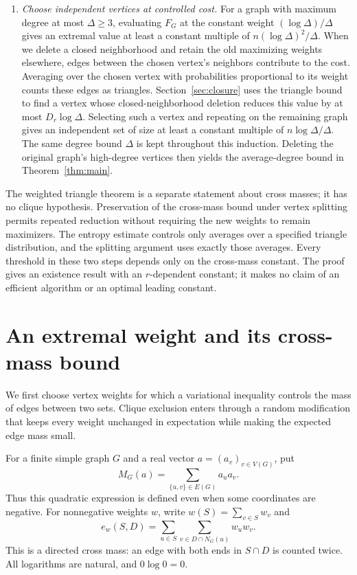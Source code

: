 \documentclass[11pt]{article}
\theoremstyle{definition}
\theoremstyle{remark}
\numberwithin{equation}{section}
\begin{document}
\begin{enumerate}
\item \emph{Choose independent vertices at controlled cost.}
For a graph with maximum degree at most $\Delta\ge3$, evaluating $F_G$ at
the constant weight $(\log\Delta)/\Delta$ gives an extremal value at
least a constant multiple of $n(\log\Delta)^2/\Delta$.
When we delete a closed neighborhood and retain the old maximizing weights
elsewhere, edges between the chosen vertex's neighbors contribute to
the cost. Averaging over the chosen vertex with probabilities proportional
to its weight counts these edges as triangles.
Section~\ref{sec:closure} uses the triangle bound to find a vertex whose
closed-neighborhood deletion reduces this value by at most
$D_r\log\Delta$. Selecting such a vertex and repeating on the remaining
graph gives an independent set of size at least a constant multiple of
$n\log\Delta/\Delta$. The same degree bound $\Delta$ is kept throughout
this induction. Deleting the original graph's high-degree vertices then
yields the average-degree bound in Theorem~\ref{thm:main}.
\end{enumerate}

The weighted triangle theorem is a separate statement about cross masses;
it has no clique hypothesis. Preservation of the cross-mass bound under
vertex splitting permits repeated reduction without requiring the new weights to
remain maximizers. The entropy estimate controls only averages over a
specified triangle distribution, and the splitting argument uses exactly
those averages. Every threshold in these two steps depends only on the
cross-mass constant. The proof gives an existence result with an
$r$-dependent constant; it makes no claim of an efficient algorithm or
an optimal leading constant.

\section{An extremal weight and its cross-mass bound}
\label{sec:optimizer}

We first choose vertex weights for which a variational inequality controls
the mass of edges between two sets.  Clique exclusion enters through a
random modification that keeps every weight unchanged in expectation while
making the expected edge mass small.

For a finite simple graph $G$ and a real vector $a=(a_v)_{v\in V(G)}$, put
\[
 M_G(a)=\sum_{\{u,v\}\in E(G)}a_ua_v.
\]
Thus this quadratic expression is defined even when some coordinates are
negative.  For nonnegative weights $w$, write $w(S)=\sum_{v\in S}w_v$ and
\[
 e_w(S,D)=\sum_{u\in S}\sum_{v\in D\cap N_G(u)}w_uw_v.
\]
This is a directed cross mass: an edge with both ends in $S\cap D$ is
counted twice.  All logarithms are natural, and $0\log 0=0$.
\end{document}

